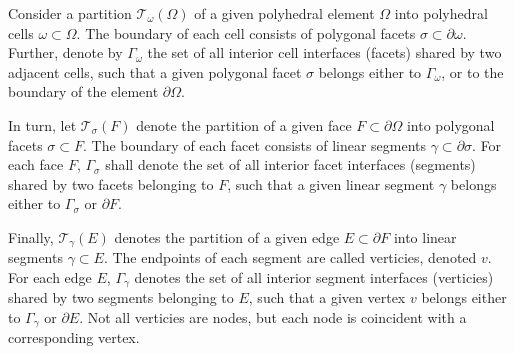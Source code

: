 	Consider a partition $\mathcal{T}_\omega (\Omega)$ of a given polyhedral element $\Omega$ into polyhedral cells $\omega \subset \Omega$. The boundary of each cell consists of polygonal facets $\sigma \subset \partial \omega$. Further, denote by $\Gamma_\omega$ the set of all interior cell interfaces (facets) shared by two adjacent cells, such that a given polygonal facet $\sigma$ belongs either to $\Gamma_\omega$, or to the boundary of the element $\partial \Omega$.
	
	In turn, let $\mathcal{T}_{\sigma} (F)$ denote the partition of a given face $F \subset \partial \Omega$ into polygonal facets $\sigma \subset F$. The boundary of each facet consists of linear segments $\gamma \subset \partial \sigma$. For each face $F$, $\Gamma_\sigma$ shall denote the set of all interior facet interfaces (segments) shared by two facets belonging to $F$, such that a given linear segment $\gamma$ belongs either to $\Gamma_\sigma$ or $\partial F$.
	
	Finally, $\mathcal{T}_{\gamma} (E)$ denotes the partition of a given edge $E \subset \partial F$ into linear segments $\gamma \subset E$. The endpoints of each segment are called verticies, denoted $v$. For each edge $E$, $\Gamma_\gamma$ denotes the set of all interior segment interfaces (verticies) shared by two segments belonging to $E$, such that a given vertex $v$ belongs either to $\Gamma_\gamma$ or $\partial E$. Not all verticies are nodes, but each node is coincident with a corresponding vertex.
	
